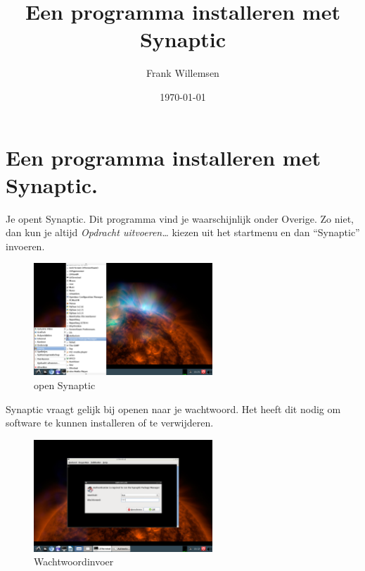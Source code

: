 \documentclass[12pt,a4paper]{article}
\begin{document}
\graphicspath{{images/}}
\lstset{language=bash}
\author{Frank Willemsen}
\title{Een programma installeren met Synaptic}
\date{\today}
\maketitle
{}
\section{Een programma installeren met Synaptic.}


Je opent Synaptic. Dit programma vind je waarschijnlijk onder Overige. Zo niet, dan kun je altijd \emph{Opdracht uitvoeren\ldots} kiezen uit het startmenu en dan ``Synaptic'' invoeren. 

\begin{figure} [H]
\centering
\includegraphics[width=0.6\textwidth]{plaatje01}
\caption{open Synaptic}
\label{plaatje01}
\end{figure}

\noindent Synaptic vraagt gelijk bij openen naar je wachtwoord. Het heeft dit nodig om software te kunnen installeren of te verwijderen.

\begin{figure} [H]
\centering
\includegraphics[width=0.6\textwidth]{plaatje02}
\caption{Wachtwoordinvoer}
\label{plaatje02}
\end{figure}
\end{document}
